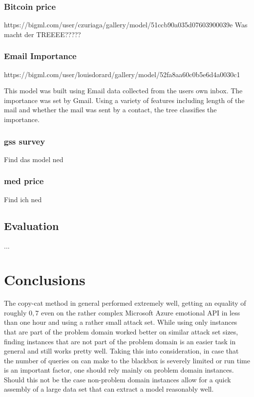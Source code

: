 \documentclass[a4paper,11pt]{article}
\begin{document}
        \subsubsection{Bitcoin price} 
        https://bigml.com/user/czuriaga/gallery/model/51ccb90a035d07603900039e
        Was macht der TREEEE?????
        \subsubsection{Email Importance}
        https://bigml.com/user/louisdorard/gallery/model/52fa8aa60c0b5e6d4a0030c1
        
        This model was built using Email data collected from the users own inbox. The importance was set by Gmail. Using a variety of features including length of the mail and whether the mail was sent by a contact, the tree classifies the importance.
        \subsubsection{gss survey}
        Find das model ned
        \subsubsection{med price}
        Find ich ned
    \subsection{Evaluation}
        ...

\section{Conclusions}
    The copy-cat method in general performed extremely well, getting an equality of roughly $0,7$ even on the rather complex Microsoft Azure emotional API in less than one hour and using a rather small attack set. While using only instances that are part of the problem domain worked better on similar attack set sizes, finding instances that are not part of the problem domain is an easier task in general and still works pretty well. Taking this into consideration, in case that the number of queries on can make to the blackbox is severely limited or run time is an important factor, one should rely mainly on problem domain instances. Should this not be the case non-problem domain instances allow for a quick assembly of a large data set that can extract a model reasonably well.




\end{document}

